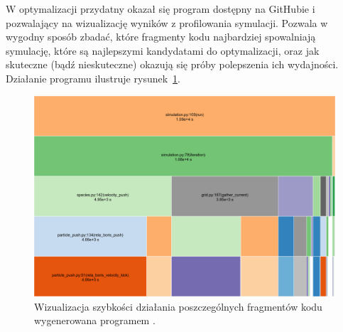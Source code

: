 W optymalizacji przydatny okazał się program \cite{snakeviz} dostępny na
GitHubie i pozwalający na wizualizację wyników z profilowania
symulacji. Pozwala w wygodny sposób zbadać, które fragmenty kodu najbardziej
spowalniają symulację, które są najlepszymi kandydatami do optymalizacji, oraz
jak skuteczne (bądź nieskuteczne) okazują się próby polepszenia ich wydajności.
Działanie programu ilustruje rysunek~\ref{fig:snakeviz}.
\begin{figure}[h!]
  \includegraphics[width=\textwidth]{Images/snakeviz}
  \caption{Wizualizacja szybkości działania poszczególnych fragmentów kodu
    wygenerowana programem .}
  \label{fig:snakeviz}
\end{figure}
